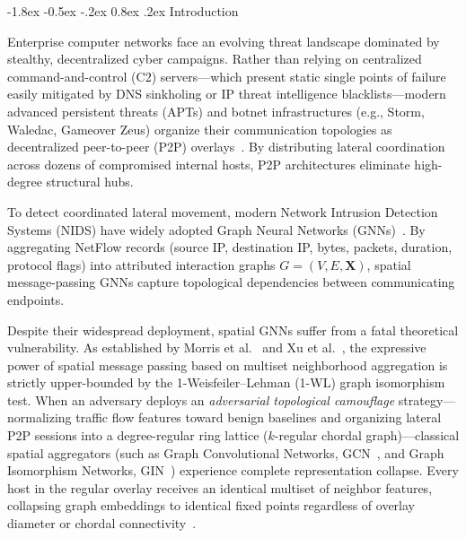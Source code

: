 \documentclass[10pt,twocolumn,letterpaper]{article}
\makeatletter
\renewcommand\section{\@startsection {section}{1}{\z@}%
                                   {-1.8ex \@plus -0.5ex \@minus -.2ex}%
                                   {0.8ex \@plus .2ex}%
                                   {\normalfont\large\bfseries}}
\makeatother
\begin{document}
\section{Introduction}
\label{sec:intro}

Enterprise computer networks face an evolving threat landscape dominated by stealthy, decentralized cyber campaigns. Rather than relying on centralized command-and-control (C2) servers---which present static single points of failure easily mitigated by DNS sinkholing or IP threat intelligence blacklists---modern advanced persistent threats (APTs) and botnet infrastructures (e.g., Storm, Waledac, Gameover Zeus) organize their communication topologies as decentralized peer-to-peer (P2P) overlays~\cite{grizzard2007peer, garcia2014empirical}. By distributing lateral coordination across dozens of compromised internal hosts, P2P architectures eliminate high-degree structural hubs.

To detect coordinated lateral movement, modern Network Intrusion Detection Systems (NIDS) have widely adopted Graph Neural Networks (GNNs)~\cite{zhou2022hierarchical, lo2022dlgnn}. By aggregating NetFlow records (source IP, destination IP, bytes, packets, duration, protocol flags) into attributed interaction graphs $G = (V, E, \mathbf{X})$, spatial message-passing GNNs capture topological dependencies between communicating endpoints.

Despite their widespread deployment, spatial GNNs suffer from a fatal theoretical vulnerability. As established by Morris et al.~\cite{morris2019weisfeiler} and Xu et al.~\cite{xu2019powerful}, the expressive power of spatial message passing based on multiset neighborhood aggregation is strictly upper-bounded by the 1-Weisfeiler--Lehman (1-WL) graph isomorphism test. When an adversary deploys an \textit{adversarial topological camouflage} strategy---normalizing traffic flow features toward benign baselines and organizing lateral P2P sessions into a degree-regular ring lattice ($k$-regular chordal graph)---classical spatial aggregators (such as Graph Convolutional Networks, GCN~\cite{kipf2017semi}, and Graph Isomorphism Networks, GIN~\cite{xu2019powerful}) experience complete representation collapse. Every host in the regular overlay receives an identical multiset of neighbor features, collapsing graph embeddings to identical fixed points regardless of overlay diameter or chordal connectivity~\cite{dwivedi2023benchmarking}.
\end{document}
